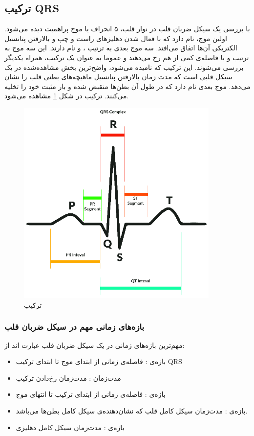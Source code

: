 \subsection{ترکیب QRS}
با بررسی یک سیکل ضربان قلب در نوار قلب، ۵ انحراف
یا موج پراهمیت دیده می‌شود. اولین موج،  نام دارد که با فعال شدن دهلیزهای راست و چپ و بالارفتن پتانسیل الکتریکی آن‌ها اتفاق می‌افتد. سه موج بعدی به ترتیب ،  و  نام دارند. این سه موج به ترتیب و با فاصله‌ی کمی از هم رخ می‌دهند و عموما به عنوان یک ترکیب، همراه یکدیگر بررسی می‌شوند. این ترکیب که  نامیده می‌شود، واضح‌ترین بخش مشاهده‌شده در یک سیکل قلبی است که مدت زمان بالارفتن پتانسیل ماهیچه‌های بطنی قلب را نشان می‌دهد. موج بعدی  نام دارد که در طول آن بطن‌ها منقبض شده و بار مثبت خود را تخلیه می‌کنند. ترکیب  در شکل \ref{fig:QRS} مشاهده می‌شود.

\begin{figure}
\centering
\includegraphics[width=10cm]{Figures/qrs.png}
\caption{ ترکیب  \cite{Miramontes2017}}
\label{fig:QRS}
\end{figure}
 
\subsubsection{بازه‌های زمانی مهم در سیکل ضربان قلب}
مهم‌ترین بازه‌های زمانی در یک سیکل ضربان قلب عبارت اند از:
\begin{itemize}
	\item بازه‌ی : فاصله‌ی زمانی از ابتدای موج  تا ابتدای ترکیب QRS 
	\item مدت‌زمان : مدت‌زمان رخ‌دادن ترکیب 
	\item بازه‌ی : فاصله‌ی زمانی از ابتدای ترکیب  تا انتهای موج 
	\item بازه‌ی : مدت‌زمان سیکل کامل قلب که نشان‌دهنده‌ی سیکل کامل بطن‌ها می‌باشد. 
	\item بازه‌ی : مدت‌زمان سیکل کامل دهلیزی
\end{itemize}


